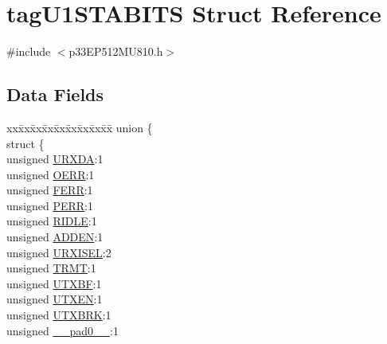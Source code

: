 \hypertarget{structtag_u1_s_t_a_b_i_t_s}{}\section{tag\+U1\+S\+T\+A\+B\+I\+TS Struct Reference}
\label{structtag_u1_s_t_a_b_i_t_s}


{\ttfamily \#include $<$p33\+E\+P512\+M\+U810.\+h$>$}

\subsection*{Data Fields}
\begin{DoxyCompactItemize}
\item 
\begin{tabbing}
xx\=xx\=xx\=xx\=xx\=xx\=xx\=xx\=xx\=\kill
union \{\\
\>struct \{\\
\>\>unsigned \hyperlink{structtag_u1_s_t_a_b_i_t_s_afe0995f70524f97d3bbf5a19da8be125}{URXDA}:1\\
\>\>unsigned \hyperlink{structtag_u1_s_t_a_b_i_t_s_a51850c0a0e36c88695788d8258825fb1}{OERR}:1\\
\>\>unsigned \hyperlink{structtag_u1_s_t_a_b_i_t_s_a6e9c49ea6356906ea25431c922eb7c71}{FERR}:1\\
\>\>unsigned \hyperlink{structtag_u1_s_t_a_b_i_t_s_a5223bc48d63e95d58e42b4cdd2edbf26}{PERR}:1\\
\>\>unsigned \hyperlink{structtag_u1_s_t_a_b_i_t_s_a8016ed1f9d9355d999bd0b5acfce06da}{RIDLE}:1\\
\>\>unsigned \hyperlink{structtag_u1_s_t_a_b_i_t_s_aa4d6c69beac6d542ad6bc014875fdff2}{ADDEN}:1\\
\>\>unsigned \hyperlink{structtag_u1_s_t_a_b_i_t_s_a8d6af72bfcd1f23f63ace4f6e89dfcdf}{URXISEL}:2\\
\>\>unsigned \hyperlink{structtag_u1_s_t_a_b_i_t_s_a63ff36fd0aa1645fb63d427eb941f177}{TRMT}:1\\
\>\>unsigned \hyperlink{structtag_u1_s_t_a_b_i_t_s_ae6f14589464b1e04ff7734553772427e}{UTXBF}:1\\
\>\>unsigned \hyperlink{structtag_u1_s_t_a_b_i_t_s_aa6ca11f821bfebd67e7001d212fbceea}{UTXEN}:1\\
\>\>unsigned \hyperlink{structtag_u1_s_t_a_b_i_t_s_a5e99a7959107d3aa21958bad8ee4bc6e}{UTXBRK}:1\\
\>\>unsigned \hyperlink{structtag_u1_s_t_a_b_i_t_s_adf71f3d8410c1f1dbbc96680a92c49af}{\_\_pad0\_\_}:1\\

\end{tabbing}
\end{DoxyCompactItemize}
